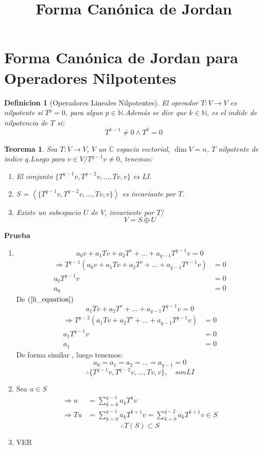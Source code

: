 \documentclass[10pt,a4paper]{article}
\title{Forma Canónica de Jordan}
\newtheorem{mydef}{Definicion}[section]
\newtheorem{mytheo}{Teorema}
\begin{document}
\maketitle


\section{Forma Canónica de Jordan para Operadores Nilpotentes}
\begin{mydef}[Operadores Lineales Nilpotentes]
	El operador $T:V\rightarrow V$ es nilpotente si $T^{p} = 0$, para algun $p\in\mathbb{N}$.Además se dice que $k\in\mathbb{N}$, es el indide de nilpotencia de $T$ si:
$$T^{k-1}\neq 0 \wedge T^{k} = 0$$

\end{mydef}

\begin{mytheo}\label{theo_nilpotentes}
	Sea $T:V\rightarrow V$, $V$ un $\mathbb{C}$ espacio vectorial, $\dim V = n$, $T$ nilpotente de indice $q$.Luego para $v\in V/ T^{q-1}v\neq 0$, tenemos:
	\begin{enumerate}
		\item El conjunto $\{T^{q-1}v, T^{q-2}v,\ldots,Tv, v\}$ es LI.
		\item S = $\left<\{T^{q-1}v, T^{q-2}v,\ldots,Tv, v\}\right>$ es invariante por $T$.
		\item Existe un subespacio $U$ de $V$, invariante por $T/$
		$$V = S\oplus U$$
	\end{enumerate}
\end{mytheo}

\textbf{Prueba}
\begin{enumerate}
	\item \begin{equation}\label{li_equation}
		a_{0}v + a_{1}Tv + a_{2}T^{v} + \ldots + a_{q-1}T^{q-1}v = 0
	\end{equation}
	\begin{align*}
		\Rightarrow T^{q-1}\left(a_{0}v + a_{1}Tv + a_{2}T^{v} + \ldots + a_{q-1}T^{q-1}v\right) & = 0\\
		a_{0}T^{q-1}v &= 0\\
		a_{0} &= 0
	\end{align*}
	De $(\ref{li_equation})$
	$$a_{1}Tv + a_{2}T^{v} + \ldots + a_{q-1}T^{q-1}v = 0$$
	\begin{align*}
		\Rightarrow T^{q-2}\left(a_{1}Tv + a_{2}T^{v} + \ldots + a_{q-1}T^{q-1}v\right) & = 0\\
		a_{1}T^{q-1}v &= 0\\
		a_{1} &= 0
	\end{align*}
	De forma similar , luego tenemos:
		$$a_{0} = a_{1} = a_{2} = \ldots = a_{q-1} = 0$$
		$$\therefore \{T^{q-1}v, T^{q-2}v,\ldots,Tv, v\},\quad son LI$$
	\item Sea $ u\in S$
		\begin{align*}
			\Rightarrow u &= \sum_{k=0}^{q-1}a_{k}T^{k}v\\
			\Rightarrow Tu &=  \sum_{k=0}^{q-1}a_{k}T^{k+1}v = \sum_{k=0}^{q-2}a_{k}T^{k+1}v\in S
		\end{align*}
		$$\therefore T(S)\subset S$$
	\item VER
\end{enumerate}
\end{document}
